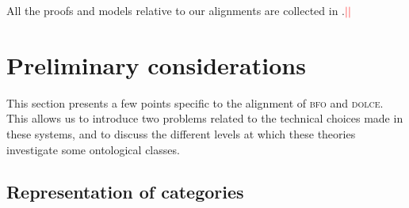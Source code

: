 \documentclass[ao]{iosart2x}
\newcommand{\nb}[1]{\textcolor{red}{$|$}\marginpar{\hspace*{-0cm}\parbox{20mm}{\scriptsize\raggedright\textcolor{red}{#1}}}}
\newcommand{\dolce}{{\textsc{dolce}}}
\newcommand{\bfo}{{\textsc{bfo}}}
\newcommand{\bfoiof}[1]{{\,::_{#1\:\!}}}
\begin{document}
%



All the proofs and models relative to our alignments are collected in \citep{??}.\nb{CM: mettiamo il del d2.4 in cui manca qualcosa o un rapporto?}\nb{a che punto è il d2.4?}

\section{Preliminary considerations}\label{sect_prelim_considerations}
This section presents a few points specific to the alignment of {\bfo} and {\dolce}. This allows us to introduce two problems related to the technical choices made in these systems, and to discuss the different levels at which these theories investigate some ontological classes. 



\subsection{Representation of categories}\label{sect_problem_univ}
\end{document}
